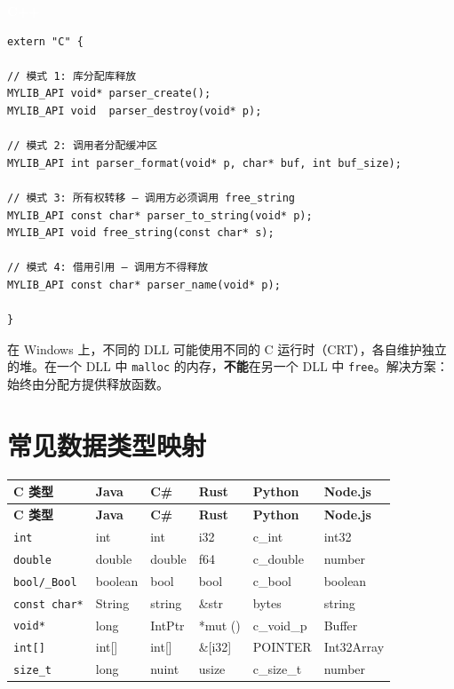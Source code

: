 \documentclass[12pt,a4paper,fontset=fandol]{ctexbook}
\newcommand{\cpplabel}{%
  \begin{tcolorbox}[enhanced,colback=cppheadbg,colframe=cppheadbg,
    arc=1mm,boxrule=0mm,left=6pt,right=6pt,top=2pt,bottom=2pt,
    halign=left,oversize]
    \textcolor{white}{\small\bfseries C++}
  \end{tcolorbox}\vspace{-4pt}}
\begin{document}
\cpplabel
\begin{lstlisting}[style=cppstyle]
extern "C" {

// 模式 1: 库分配库释放
MYLIB_API void* parser_create();
MYLIB_API void  parser_destroy(void* p);

// 模式 2: 调用者分配缓冲区
MYLIB_API int parser_format(void* p, char* buf, int buf_size);

// 模式 3: 所有权转移 — 调用方必须调用 free_string
MYLIB_API const char* parser_to_string(void* p);
MYLIB_API void free_string(const char* s);

// 模式 4: 借用引用 — 调用方不得释放
MYLIB_API const char* parser_name(void* p);

}
\end{lstlisting}

\begin{tcolorbox}[warning={跨 DLL 边界释放内存}]
在 Windows 上，不同的 DLL 可能使用不同的 C 运行时（CRT），各自维护独立的堆。在一个 DLL 中 \texttt{malloc} 的内存，\textbf{不能}在另一个 DLL 中 \texttt{free}。解决方案：始终由分配方提供释放函数。
\end{tcolorbox}

\section{常见数据类型映射}

\begin{longtable}{lp{2cm}p{2cm}p{2cm}p{2cm}p{2cm}}
\toprule
\textbf{C 类型} & \textbf{Java} & \textbf{C\#} & \textbf{Rust} & \textbf{Python} & \textbf{Node.js} \\
\midrule
\endfirsthead
\toprule
\textbf{C 类型} & \textbf{Java} & \textbf{C\#} & \textbf{Rust} & \textbf{Python} & \textbf{Node.js} \\
\midrule
\endhead
\texttt{int}          & int      & int     & i32     & c\_int   & int32      \\
\texttt{double}       & double   & double  & f64     & c\_double& number     \\
\texttt{bool/\_Bool}  & boolean  & bool    & bool    & c\_bool  & boolean    \\
\texttt{const char*}  & String   & string  & \&str   & bytes    & string     \\
\texttt{void*}        & long     & IntPtr  & *mut () & c\_void\_p & Buffer   \\
\texttt{int[]}        & int[]    & int[]   & \&[i32] & POINTER  & Int32Array \\
\texttt{size\_t}      & long     & nuint   & usize   & c\_size\_t & number  \\
\bottomrule
\end{longtable}
\end{document}
